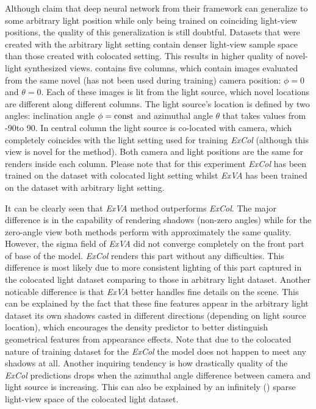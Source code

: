 Although \cite{bi2020neural} claim that deep neural network from their framework
can generalize to some arbitrary light position while only being trained on coinciding light-view positions,
the quality of this generalization is still doubtful.
Datasets that were created with the arbitrary light setting
contain denser light-view sample space than those created with colocated setting.
This results in higher quality of novel-light synthesized views.
 contains five columns,
which contain images evaluated from the same novel (has not been used during training) camera position: $\phi = 0$ and $\theta = 0$.
Each of these images is lit from the light source,
which novel locations are different along different columns.
The light source's location is defined by two angles:
inclination angle $\phi = \mathrm{const}$ and azimuthal angle $\theta$
that takes values from -90\textdegree to 90\textdegree.
In central column the light source is co-located with camera,
which completely coincides with the light setting used for training \textit{ExCol}
(although this view is novel for the method).
Both camera and light positions are the same for renders inside each column.
Please note that for this experiment \textit{ExCol} has been trained on the dataset with colocated light setting
whilst \textit{ExVA} has been trained on the dataset with arbitrary light setting.


It can be clearly seen that \textit{ExVA} method outperforms \textit{ExCol}.
The major difference is in the capability of rendering shadows (non-zero angles)
while for the zero-angle view both methods perform with approximately the same quality.
However, the sigma field of \textit{ExVA} did not converge completely on the front part of base of the model.
\textit{ExCol} renders this part without any difficulties.
This difference is most likely due to more consistent lighting of this part
captured in the colocated light dataset comparing to those in arbitrary light dataset.
Another noticable difference is that \textit{ExVA} better handles fine details on the scene.
This can be explained by the fact that these fine features appear
in the arbitrary light dataset its own shadows casted in different directions (depending on light source location),
which encourages the density predictor to better distinguish geometrical features from appearance effects.
Note that due to the colocated nature of training dataset for the \textit{ExCol}
the model does not happen to meet any shadows at all.
Another inquiring tendency is how drastically quality of the \textit{ExCol} predictions drops
when the azimuthal angle difference between camera and light source is increasing.
This can also be explained by an infinitely ()
sparse light-view space of the colocated light dataset.



